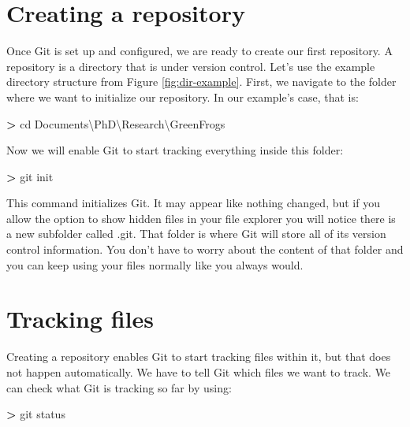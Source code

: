 \documentclass[
]{book}
\newenvironment{Shaded}{\begin{snugshade}}{\end{snugshade}}
\newcommand{\ExtensionTok}[1]{#1}
\newcommand{\NormalTok}[1]{#1}
\newcommand{\OperatorTok}[1]{\textcolor[rgb]{0.81,0.36,0.00}{\textbf{#1}}}
\begin{document}
\hypertarget{creating-a-repository}{%
\section{Creating a repository}\label{creating-a-repository}}

Once Git is set up and configured, we are ready to create our first repository. A repository is a directory that is under version control. Let's use the example directory structure from Figure \ref{fig:dir-example}. First, we navigate to the folder where we want to initialize our repository. In our example's case, that is:

\begin{Shaded}
\begin{Highlighting}[]
\OperatorTok{\textgreater{}}\NormalTok{ cd }\ExtensionTok{Documents\textbackslash{}PhD\textbackslash{}Research\textbackslash{}GreenFrogs}
\end{Highlighting}
\end{Shaded}

Now we will enable Git to start tracking everything inside this folder:

\begin{Shaded}
\begin{Highlighting}[]
\OperatorTok{\textgreater{}}\NormalTok{ git }\ExtensionTok{init}
\end{Highlighting}
\end{Shaded}

This command initializes Git. It may appear like nothing changed, but if you allow the option to show hidden files in your file explorer you will notice there is a new subfolder called .git. That folder is where Git will store all of its version control information. You don't have to worry about the content of that folder and you can keep using your files normally like you always would.

\hypertarget{tracking-files}{%
\section{Tracking files}\label{tracking-files}}

Creating a repository enables Git to start tracking files within it, but that does not happen automatically. We have to tell Git which files we want to track. We can check what Git is tracking so far by using:

\begin{Shaded}
\begin{Highlighting}[]
\OperatorTok{\textgreater{}}\NormalTok{ git }\ExtensionTok{status} 
\end{Highlighting}
\end{Shaded}
\end{document}
